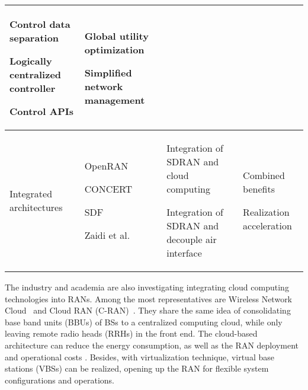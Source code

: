 \documentclass[12pt, draftclsnofoot,onecolumn]{IEEEtran}
\makeatletter
\let\savespace\@minipagetrue
\makeatother
\begin{document}
\begin{table}[!t]
\begin{tabularx}{\textwidth}{|l|X|X|X|}
\begin{compactitem}
      \item Control data separation
      \item Logically centralized controller
      \item Control APIs
    \end{compactitem} & \savespace
    \begin{compactitem}
      \item Global utility optimization
      \item Simplified network management
    \end{compactitem} \\
    \hline
    Integrated architectures &
    \begin{compactitem}
      \item OpenRAN~\cite{yang2013openran}
      \item CONCERT~\cite{liu2014concert}
      \item SDF~\cite{arslan2015software}
      \item Zaidi et al.~\cite{zaidi2015future}
    \end{compactitem} &
    \savespace
    \begin{compactitem}
      \item Integration of SDRAN and cloud computing
      \item Integration of SDRAN and decouple air interface
    \end{compactitem} & \savespace
    \begin{compactitem}
      \item Combined benefits
      \item Realization acceleration
    \end{compactitem} \\
    \hline
  \end{tabularx}
\end{table}

The industry and academia are also investigating integrating cloud computing
technologies into RANs. Among the most representatives are Wireless Network
Cloud~\cite{lin2010wireless} and Cloud RAN (C-RAN)~\cite{cmri2013cran}.
They share the same idea of consolidating base band units (BBUs) of BSs to a centralized computing cloud, while only leaving remote radio heads (RRHs) in the front end.
The cloud-based architecture can reduce the energy consumption, as well as the RAN
deployment and operational costs \cite{cmri2013cran}. Besides,
with virtualization technique, virtual base stations (VBSs) can be realized,
opening up the RAN for flexible system configurations and operations.
\end{document}
